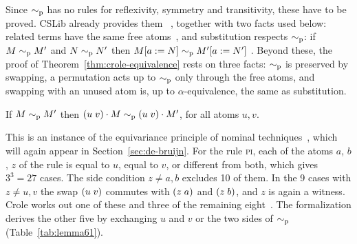 Since $\sim_{\mathrm{p}}$ has no rules for reflexivity, symmetry and
transitivity, these have to be proved. CSLib already provides
them~%
%
,
together with two facts used below: related terms have the same free
atoms~, and
substitution respects $\sim_{\mathrm{p}}$: if $M \sim_{\mathrm{p}} M'$ and $N \sim_{\mathrm{p}} N'$ then
$M[a \mathrel{{:}{=}} N] \sim_{\mathrm{p}} M'[a \mathrel{{:}{=}} N']$
.
Beyond these, the proof of
Theorem~\ref{thm:crole-equivalence} rests on three facts: $\sim_{\mathrm{p}}$ is
preserved by swapping, a permutation acts up to $\sim_{\mathrm{p}}$ only through
the free atoms, and swapping with an unused atom is, up to
$\alpha$-equivalence, the same as substitution.

\begin{lemma}
\label{lem:swap-preserve}
If $M \sim_{\mathrm{p}} M'$ then $(u\;v) \cdot M \sim_{\mathrm{p}} (u\;v) \cdot M'$, for
all atoms $u, v$.
\end{lemma}

This is an instance of the equivariance principle of nominal
techniques~\cite[Theorem~4.4]{gabbay2011a}, which will again appear in Section~\ref{sec:de-bruijn}.
For the rule \textsc{pi}, each of the atoms $a$, $b$, $z$ of the rule
is equal to $u$, equal to $v$, or different from both, which gives
$3^3 = 27$ cases. The side condition $z \neq a, b$ excludes 10 of
them. In the 9 cases with $z \neq u, v$ the swap $(u\;v)$ commutes
with $(z\;a)$ and $(z\;b)$, and $z$ is again a witness. Crole
works out one of these and three of the remaining
eight~\cite[pp.~14--15]{crole2012a}. The formalization derives the
other five by exchanging $u$ and $v$ or the two sides of $\sim_{\mathrm{p}}$
(Table~\ref{tab:lemma61}).

